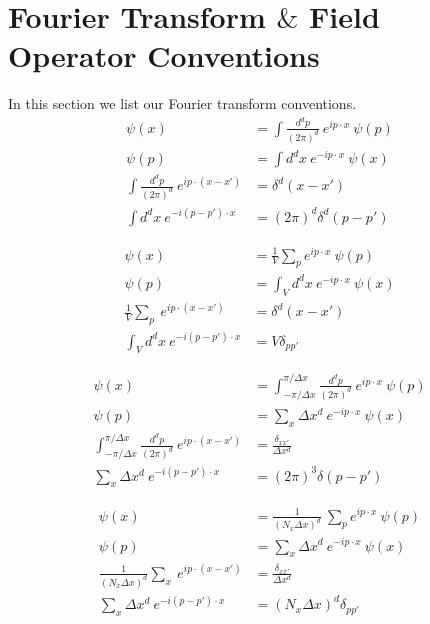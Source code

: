 \section{Fourier Transform $\&$ Field Operator Conventions}\label{sec:ft-conv}
In this section we list our Fourier transform conventions. \\

\begin{align}
\psi(x) & = \int \frac{d^d p}{(2 \pi)^d} ~ e^{i p\cdot x} ~ \psi(p) \\
\psi(p) & = \int d^d x ~ e^{-i p\cdot x} ~ \psi(x) \\
\int \frac{d^d p}{(2 \pi)^d} ~ e^{i p\cdot (x-x')} & = \delta^d(x-x') \\
\int d^d x ~ e^{-i (p - p') \cdot x} & = (2\pi)^d\delta^d(p-p') 
\end{align}

\begin{align}
\psi(x) & = \frac{1}{V} \sum_p e^{i p\cdot x} ~ \psi(p) \\
\psi(p) & = \int_V d^d x ~ e^{-i p\cdot x} ~ \psi(x) \\
\frac{1}{V}\sum_p ~ e^{i p\cdot (x-x')} & = \delta^d(x-x') \\
\int_V d^d x ~ e^{-i (p - p') \cdot x} & = V \delta_{p p'} 
\end{align}

\begin{align}
\psi(x) & =  \int_{-\pi/\Delta x}^{\pi/\Delta x} \frac{d^d p}{(2\pi)^d} ~ e^{i p\cdot x} ~ \psi(p) \\
\psi(p) & = \sum_x \Delta x^d ~ e^{-i p\cdot x} ~ \psi(x) \\
\int_{-\pi/\Delta x}^{\pi/\Delta x} \frac{d^d p}{(2\pi)^d} ~ e^{i p\cdot (x-x')} & = \frac{\delta_{x x'}}{\Delta x^d} \\
\sum_x \Delta x^d ~ e^{-i (p - p') \cdot x} & = (2\pi)^3 \delta(p - p') 
\end{align}

\begin{align}
\psi(x) & = \frac{1}{(N_x \Delta x)^d} ~ \sum_p e^{i p\cdot x} ~ \psi(p) \\
\psi(p) & = \sum_x \Delta x^d ~ e^{-i p\cdot x} ~ \psi(x) \\
\frac{1}{(N_x \Delta x)^d}\sum_x ~ e^{i p \cdot (x -x')} & = \frac{ \delta_{x x'}}{\Delta x^d} \\
\sum_x \Delta x^d ~ e^{-i (p-p')\cdot x} & = (N_x \Delta x)^d \delta_{p p'} 
\end{align}

